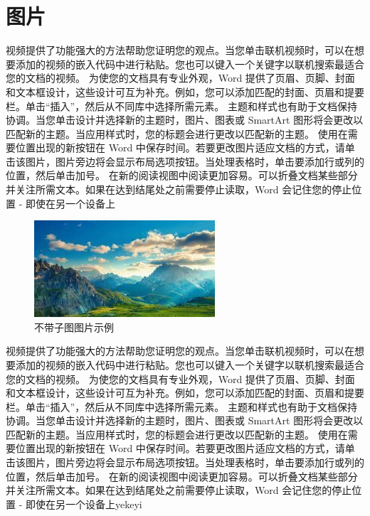 \section{图片}
视频提供了功能强大的方法帮助您证明您的观点。当您单击联机视频时，可以在想要添加的视频的嵌入代码中进行粘贴。您也可以键入一个关键字以联机搜索最适合您的文档的视频。
为使您的文档具有专业外观，Word 提供了页眉、页脚、封面和文本框设计，这些设计可互为补充。例如，您可以添加匹配的封面、页眉和提要栏。单击“插入”，然后从不同库中选择所需元素。
主题和样式也有助于文档保持协调。当您单击设计并选择新的主题时，图片、图表或 SmartArt 图形将会更改以匹配新的主题。当应用样式时，您的标题会进行更改以匹配新的主题。
使用在需要位置出现的新按钮在 Word 中保存时间。若要更改图片适应文档的方式，请单击该图片，图片旁边将会显示布局选项按钮。当处理表格时，单击要添加行或列的位置，然后单击加号。
在新的阅读视图中阅读更加容易。可以折叠文档某些部分并关注所需文本。如果在达到结尾处之前需要停止读取，Word 会记住您的停止位置 - 即使在另一个设备上
\begin{figure}[H]
	\centering
	\includegraphics[width=0.6\textwidth]{figure/chapter1/Omni.jpg}
	\caption{不带子图图片示例 }	
	\label{picexam}
\end{figure}
视频提供了功能强大的方法帮助您证明您的观点。当您单击联机视频时，可以在想要添加的视频的嵌入代码中进行粘贴。您也可以键入一个关键字以联机搜索最适合您的文档的视频。
为使您的文档具有专业外观，Word 提供了页眉、页脚、封面和文本框设计，这些设计可互为补充。例如，您可以添加匹配的封面、页眉和提要栏。单击“插入”，然后从不同库中选择所需元素。
主题和样式也有助于文档保持协调。当您单击设计并选择新的主题时，图片、图表或 SmartArt 图形将会更改以匹配新的主题。当应用样式时，您的标题会进行更改以匹配新的主题。
使用在需要位置出现的新按钮在 Word 中保存时间。若要更改图片适应文档的方式，请单击该图片，图片旁边将会显示布局选项按钮。当处理表格时，单击要添加行或列的位置，然后单击加号。
在新的阅读视图中阅读更加容易。可以折叠文档某些部分并关注所需文本。如果在达到结尾处之前需要停止读取，Word 会记住您的停止位置 - 即使在另一个设备上yekeyi

